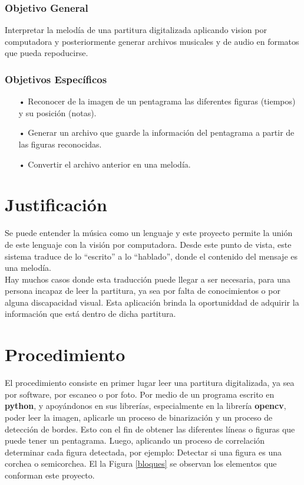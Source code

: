 \documentclass[letterpaper,12pt, twocolumn]{article}
\begin{document}
\subsubsection*{Objetivo General}
Interpretar la melodía de una partitura digitalizada 
aplicando vision por computadora y posteriormente 
generar archivos musicales y de audio en formatos que 
pueda repoducirse. 

\subsubsection*{Objetivos Específicos}
\begin{enumerate}

\item[•] Reconocer de la imagen de un pentagrama las 
diferentes figuras (tiempos) y su posición (notas). 

\item[•] Generar un archivo que guarde la información del 
pentagrama a partir de las figuras reconocidas.

\item[•] Convertir el archivo anterior en una melodía. 

\end{enumerate}

\section{Justificación}

Se puede entender la música como un lenguaje y este 
proyecto permite la unión de este lenguaje con la 
visión por computadora. Desde este punto de vista, 
este sistema traduce de lo “escrito” a lo “hablado”, 
donde el contenido del mensaje es una melodía. \\

Hay muchos casos donde esta traducción puede llegar 
a ser necesaria, para una persona incapaz de leer la 
partitura, ya sea  por falta de conocimientos o por 
alguna discapacidad visual. Esta aplicación brinda la 
oportuniddad de adquirir la información que está dentro 
de dicha partitura. 

\section{Procedimiento}

El procedimiento consiste en primer lugar leer una 
partitura digitalizada, ya sea por software, por escaneo 
o por foto. Por medio de un programa escrito en 
\textbf{python}, 
y apoyándonos en sus librerías, especialmente en la 
librería \textbf{opencv}, poder leer la imagen, 
aplicarle un 
proceso de binarización y un proceso de detección de 
bordes. Esto con el fin de obtener las diferentes 
líneas o figuras que puede tener un pentagrama. 
Luego, aplicando un proceso de correlación determinar 
cada figura detectada, por ejemplo: Detectar si una 
figura es una corchea o semicorchea. El la Figura 
\ref{bloques} se observan los elementos que conforman 
este proyecto. 
\end{document}
